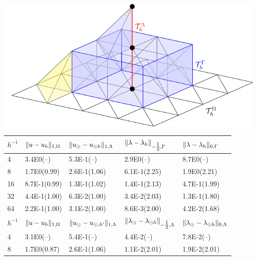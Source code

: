 \begin{table}
\begin{minipage}[b]{0.35\linewidth}
 \centering
 \includegraphics[width=\textwidth]{graphics/conform_mesh.pdf}
 \vspace{-20pt}
\label{fig:mesh}
\end{minipage}
\hspace{2pt}
\begin{minipage}[b]{0.63\textwidth}
  \scriptsize{
  \begin{center}
    \begin{tabular}{l|llll}
      \toprule
    $h^{-1}$ & $\lVert{u-u_h}\rVert_{1, \Omega}$ & $\lVert{u_{\odot}-u_{\odot h}}\rVert_{1, \Lambda}$ & $\lVert{\lambda-\lambda_h}\rVert_{-\tfrac{1}{2},\Gamma}$ & $\lVert{\lambda-\lambda_h}\rVert_{0,\Gamma}$\\
      \hline
4  & 3.4E0(--)    & 5.3E-1(--)   & 2.9E0(--)    &8.7E0(--)    \\
8  & 1.7E0(0.99)  & 2.6E-1(1.06) & 6.1E-1(2.25) &1.9E0(2.21)  \\
16 & 8.7E-1(0.99) & 1.3E-1(1.02) & 1.4E-1(2.13) &4.7E-1(1.99) \\
32 & 4.4E-1(1.00) & 6.3E-2(1.00) & 3.4E-2(2.03) &1.3E-1(1.80) \\
64 & 2.2E-1(1.00) & 3.1E-2(1.00) & 8.6E-3(2.00) &4.2E-2(1.68) \\
\midrule
$h^{-1}$ & $\lVert{u-u_h}\rVert_{1, \Omega}$ & $\lVert{u_{\odot}-u_{\odot, h^{\prime}}}\rVert_{1, \Lambda}$ & $\lVert{\lambda_{\odot}-\lambda_{\odot h}}\rVert_{-\tfrac{1}{2}, \Lambda}$ & $\lVert{\lambda_{\odot}-\lambda_{\odot h}}\rVert_{0, \Lambda}$\\
\hline
4   & 3.1E0(--)    & 5.4E-1(--)   & 4.4E-2(--)   & 7.8E-2(--)  \\
8   & 1.7E0(0.87)  & 2.6E-1(1.06) & 1.1E-2(2.01) & 1.9E-2(2.01)\\

\end{tabular}
\end{center}}
\end{minipage}
\end{table}
